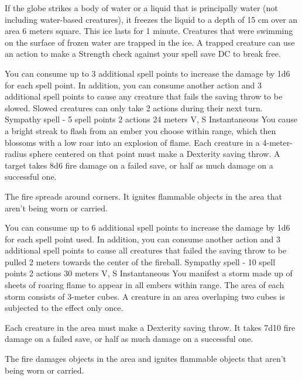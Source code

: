        If the globe strikes a body of water or a liquid that is principally water (not including water-based creatures), it freezes the liquid to a depth of 15 cm over an area 6 meters square.
        This ice lasts for 1 minute.
        Creatures that were swimming on the surface of frozen water are trapped in the ice.
        A trapped creature can use an action to make a Strength check against your spell save DC to break free.

        You can consume up to 3 additional spell points to increase the damage by 1d6 for each spell point.
        In addition, you can consume another action and 3 additional spell points to cause any creature that fails the saving throw to be slowed.
        Slowed creatures can only take 2 actions during their next turn.
        {Sympathy spell - 5 spell points}
        {2 actions}
        {24 meters}
        {V, S}
        {Instantaneous}
        You cause a bright streak to flash from an ember you choose within range, which then blossoms with a low roar into an explosion of flame.
        Each creature in a 4-meter-radius sphere centered on that point must make a Dexterity saving throw.
        A target takes 8d6 fire damage on a failed save, or half as much damage on a successful one.

        The fire spreads around corners.
        It ignites flammable objects in the area that aren't being worn or carried.

        You can consume up to 6 additional spell points to increase the damage by 1d6 for each spell point used.
        In addition, you can consume another action and 3 additional spell points to cause all creatures that failed the saving throw to be pulled 2 meters towards the center of the fireball.
        {Sympathy spell - 10 spell points}
        {2 actions}
        {30 meters}
        {V, S}
        {Instantaneous}
        You manifest a storm made up of sheets of roaring flame to appear in all embers within range.
        The area of each storm consists of 3-meter cubes.
        A creature in an area overlaping two cubes is subjected to the effect only once.

        Each creature in the area must make a Dexterity saving throw.
        It takes 7d10 fire damage on a failed save, or half as much damage on a successful one.

        The fire damages objects in the area and ignites flammable objects that aren't being worn or carried.

